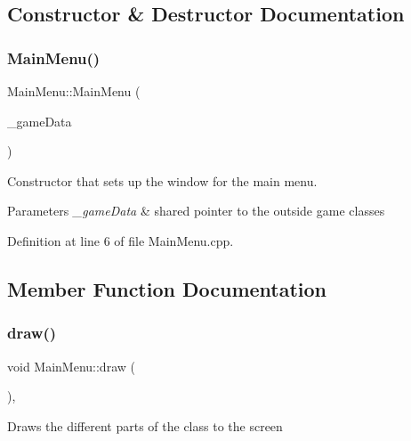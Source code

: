 \subsection{Constructor \& Destructor Documentation}
\mbox{\label{class_main_menu_a8d497d8355d40b03a6347190b13b2984}} 
\subsubsection{\texorpdfstring{MainMenu()}{MainMenu()}}
{\footnotesize\ttfamily Main\+Menu\+::\+Main\+Menu (\begin{DoxyParamCaption}\item[{\mbox{\hyperlink{_engine_8h_a5bbe002e9f7f45a67e8fda9dbe980a3f}{Game\+Data}}}]{\+\_\+game\+Data }\end{DoxyParamCaption})\hspace{0.3cm}{\ttfamily [explicit]}}

Constructor that sets up the window for the main menu. 
\begin{DoxyParams}{Parameters}
{\em \+\_\+game\+Data} & shared pointer to the outside game classes \\
\hline
\end{DoxyParams}


Definition at line 6 of file Main\+Menu.\+cpp.



\subsection{Member Function Documentation}
\mbox{\label{class_main_menu_a54ec1eed16b49cac99d640feab93e119}} 
\subsubsection{\texorpdfstring{draw()}{draw()}}
{\footnotesize\ttfamily void Main\+Menu\+::draw (\begin{DoxyParamCaption}{ }\end{DoxyParamCaption})\hspace{0.3cm}{\ttfamily [override]}, {\ttfamily [virtual]}}

Draws the different parts of the class to the screen 


